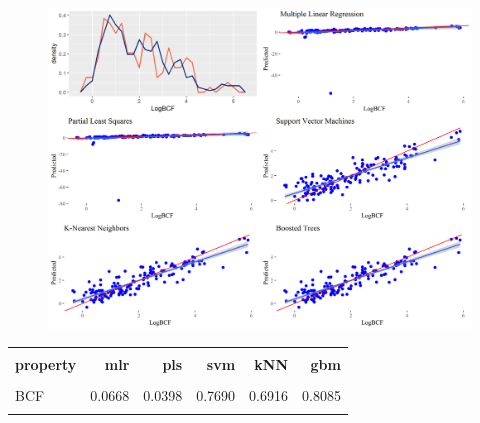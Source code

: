 \documentclass[10pt, letter]{article}
\renewcommand{\=}{\, =\, }
\newcommand{\+}{\, +\, }
\renewcommand{\-}{\, -\, }
\begin{document}
\begin{figure}[H]
  \centering
    \includegraphics[width=1.0\textwidth]{BCF_plots.png}
\end{figure}

\begin{table}[H]
\begin{center}
\begin{tabular}{lrrrrr}
\toprule
&&\\
{\bf property} & {\bf mlr} & {\bf pls} &  {\bf svm}  & {\bf kNN}  & {\bf gbm}\\
\midrule
&&\\
BCF  &   0.0668 & 0.0398 & 0.7690 & 0.6916 & 0.8085\\
&&\\
\midrule
\hline
\end{tabular}
\end{center}
\end{table}

\newpage


\end{document}

